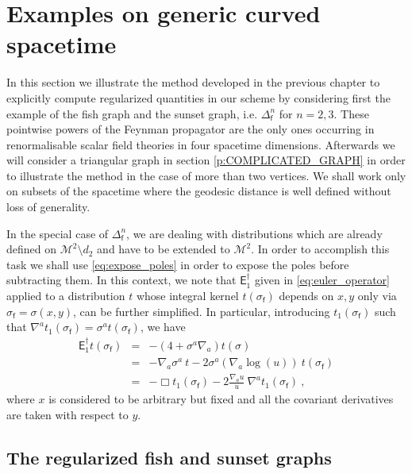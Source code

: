 \documentclass[12pt]{book}
\newcommand{\Mcal}{\mathcal{M}}
\newcommand{\Esf}{\mathsf{E}}
\newcommand{\fsf}{\mathsf{f}}
\theoremstyle{break}
\begin{document}
\section{Examples on generic curved spacetime}\label{p:EXOS}


In this section we illustrate the method developed in the previous chapter to explicitly compute regularized quantities in our scheme by considering first the example of the fish graph and the sunset graph, i.e. $\Delta^n_\fsf$ for $n=2,3$. These pointwise powers of the Feynman propagator are the only ones occurring in renormalisable scalar field theories in four spacetime dimensions. Afterwards we will consider a triangular graph in section \ref{p:COMPLICATED_GRAPH} in order to illustrate the method in the case of more than two vertices. We shall work only on subsets of the spacetime where the geodesic distance is well defined without loss of generality.


In the special case of $\Delta^n_\fsf$, we are dealing with distributions which are already defined on $\Mcal^2\setminus d_2$ and have to be extended to $\Mcal^2$. In order to accomplish this task we shall use \eqref{eq:expose_poles} in order to expose the poles before subtracting them. In this context, we note that  $\Esf^\dagger_1$ given in \eqref{eq:euler_operator} applied to a distribution $t$ whose integral kernel $t(\sigma_\fsf)$ depends on $x,y$  only via $\sigma_\fsf = \sigma(x,y)$, can be further simplified. In particular, introducing $t_1(\sigma_\fsf)$ such that $\nabla^a t_1(\sigma_\fsf) = \sigma^a t(\sigma_\fsf)$, we have
%
\begin{eqnarray}
\Esf_1^\dagger t(\sigma_\fsf) &=& -\left( 4 + \sigma^a\nabla_a \right) t(\sigma) \nonumber \\
&=& - \nabla_a \sigma^a \ t - 2 \sigma^a (\nabla_a \log (u)) \ t(\sigma_\fsf) \nonumber \\ 
&=& - \Box t_1(\sigma_\fsf) - 2 \frac{\nabla_a u}{u} \ \nabla^a t_1(\sigma_\fsf) \ , 
\label{eq:E_simplified}
\end{eqnarray}
%
where $x$ is considered to be arbitrary but fixed and all the covariant derivatives are taken with respect to $y$.


\subsection{The regularized fish and sunset graphs}
\end{document}
